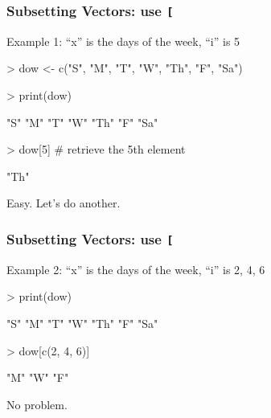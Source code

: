 \documentclass{beamer}
\newcommand{\R}[1]{\texttt{#1}}
\begin{document}
\begin{frame}[fragile]
\frametitle{Subsetting Vectors: use \R{[}}

Example 1: ``x'' is the days of the week, ``i'' is 5
\begin{Schunk}
\begin{Sinput}
> dow <- c("S", "M", "T", "W", "Th", "F", "Sa")
\end{Sinput}
\end{Schunk}
\pause
\begin{Schunk}
\begin{Sinput}
> print(dow)
\end{Sinput}
\begin{Soutput}
[1] "S"  "M"  "T"  "W"  "Th" "F"  "Sa"
\end{Soutput}
\end{Schunk}
\pause
\begin{Schunk}
\begin{Sinput}
> dow[5] # retrieve the 5th element 
\end{Sinput}
\end{Schunk}
\pause
\begin{Schunk}
\begin{Soutput}
[1] "Th"
\end{Soutput}
\end{Schunk}
\pause
Easy. Let's do another.

\end{frame}



\begin{frame}[fragile]
\frametitle{Subsetting Vectors: use \R{[}}

Example 2: ``x'' is the days of the week, ``i'' is 2, 4, 6
\pause
\begin{Schunk}
\begin{Sinput}
> print(dow)
\end{Sinput}
\begin{Soutput}
[1] "S"  "M"  "T"  "W"  "Th" "F"  "Sa"
\end{Soutput}
\end{Schunk}
\pause
\begin{Schunk}
\begin{Sinput}
> dow[c(2, 4, 6)] 
\end{Sinput}
\end{Schunk}
\pause
\begin{Schunk}
\begin{Soutput}
[1] "M" "W" "F"
\end{Soutput}
\end{Schunk}
\pause
No problem.

\end{frame}
\end{document}
